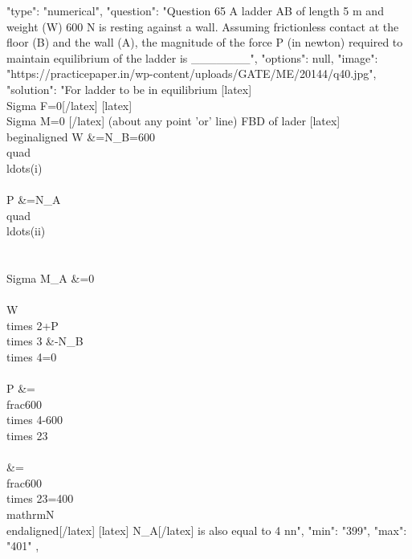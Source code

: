   {
    "type": "numerical",
    "question": "Question 65 A ladder AB of length 5 m and weight (W) 600 N is resting against a wall. Assuming frictionless contact at the floor (B) and the wall (A), the magnitude of the force P (in newton) required to maintain equilibrium of the ladder is  _______",
    "options": null,
    "image": "https://practicepaper.in/wp-content/uploads/GATE/ME/20144/q40.jpg",
    "solution": "For ladder to be in equilibrium [latex] \\Sigma F=0[/latex] [latex] \\Sigma M=0 [/latex] (about any point 'or' line) FBD of lader [latex] \\begin{aligned} W &=N_{B}=600 \\quad \\ldots(i) \\\\ P &=N_{A} \\quad \\ldots(ii)\\\\ \\Sigma M_{A} &=0 \\\\ W \\times 2+P \\times 3 &-N_{B} \\times 4=0 \\\\ P &=\\frac{600 \\times 4-600 \\times 2}{3} \\\\ &=\\frac{600 \\times 2}{3}=400 \\mathrm{N} \\end{aligned}[/latex] [latex] N_{A}[/latex] is also equal to 4 nn",
    "min": "399",
    "max": "401"
  },
